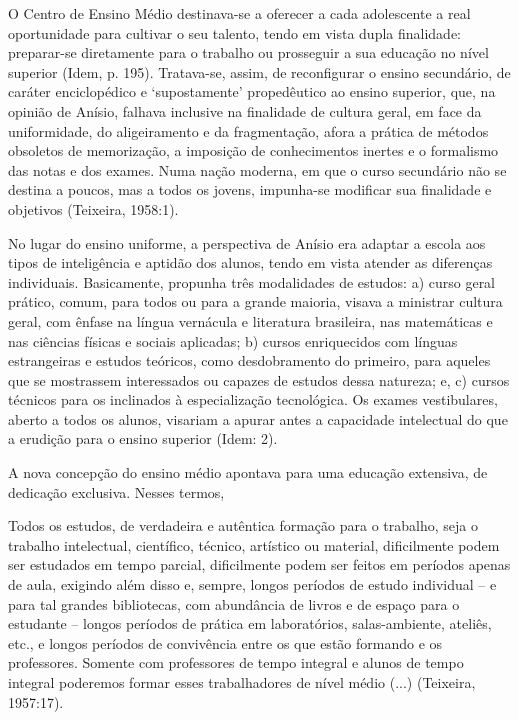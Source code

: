 O Centro de Ensino Médio destinava-se a oferecer a cada adolescente a real
oportunidade para cultivar o seu talento, tendo em vista dupla finalidade: preparar-se
diretamente para o trabalho ou prosseguir a sua educação no nível superior (Idem, p.
195). Tratava-se, assim, de reconfigurar o ensino secundário, de caráter enciclopédico e
‘supostamente’ propedêutico ao ensino superior, que, na opinião de Anísio, falhava
inclusive na finalidade de cultura geral, em face da uniformidade, do aligeiramento e da
fragmentação, afora a prática de métodos obsoletos de memorização, a imposição de
conhecimentos inertes e o formalismo das notas e dos exames. Numa nação moderna,
em que o curso secundário não se destina a poucos, mas a todos os jovens, impunha-se
modificar sua finalidade e objetivos (Teixeira, 1958:1).

No lugar do ensino uniforme, a perspectiva de Anísio era adaptar a escola aos
tipos de inteligência e aptidão dos alunos, tendo em vista atender as diferenças
individuais. Basicamente, propunha três modalidades de estudos: a) curso geral prático,
comum, para todos ou para a grande maioria, visava a ministrar cultura geral, com
ênfase na língua vernácula e literatura brasileira, nas matemáticas e nas ciências físicas
e sociais aplicadas; b) cursos enriquecidos com línguas estrangeiras e estudos teóricos,
como desdobramento do primeiro, para aqueles que se mostrassem interessados ou
capazes de estudos dessa natureza; e, c) cursos técnicos para os inclinados à
especialização tecnológica. Os exames vestibulares, aberto a todos os alunos, visariam a
apurar antes a capacidade intelectual do que a erudição para o ensino superior (Idem: 2).

A nova concepção do ensino médio apontava para uma educação extensiva, de
dedicação exclusiva. Nesses termos,

\begin{citacao}
    Todos os estudos, de verdadeira e autêntica formação para o trabalho, seja o
    trabalho intelectual, científico, técnico, artístico ou material, dificilmente
    podem ser estudados em tempo parcial, dificilmente podem ser feitos em
    períodos apenas de aula, exigindo além disso e, sempre, longos períodos de
    estudo individual – e para tal grandes bibliotecas, com abundância de livros
    e de espaço para o estudante – longos períodos de prática em laboratórios,
    salas-ambiente, ateliês, etc., e longos períodos de convivência entre os que
    estão formando e os professores. Somente com professores de tempo
    integral e alunos de tempo integral poderemos formar esses trabalhadores de
    nível médio (...) (Teixeira, 1957:17).
\end{citacao}

